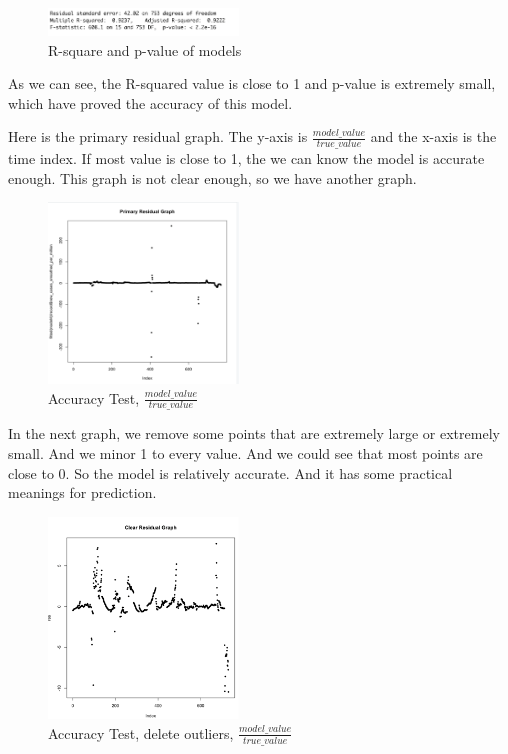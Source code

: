 \documentclass{article}
\begin{document}
\begin{multicols}{2}
\begin{figure}[H]
    \centering
    \includegraphics[width=0.45\textwidth]{errorsummary.png}
    \caption{R-square and p-value of models}
\end{figure}

As we can see, the R-squared value is close to 1 and p-value is extremely small, which have proved the accuracy of this model.

Here is the primary residual graph. The y-axis is $\frac{model\_value}{true\_value}$ and the x-axis is the time index. If most value is close to 1, the we can know the model is accurate enough. This graph is not clear enough, so we have another graph.

\begin{figure}[H]
    \centering
    \includegraphics[width=0.45\textwidth]{primaryresidual.png}
    \caption{Accuracy Test, $\frac{model\_value}{true\_value}$}
\end{figure}

In the next graph, we remove some points that are extremely large or extremely small. And we minor 1 to every value. And we could see that most points are close to 0. So the model is relatively accurate. And it has some practical meanings for prediction.

\begin{figure}[H]
    \centering
    \includegraphics[width=0.45\textwidth]{clearresidual.png}
    \caption{Accuracy Test, delete outliers, $\frac{model\_value}{true\_value}$}
\end{figure}


\end{multicols}
\end{document}
